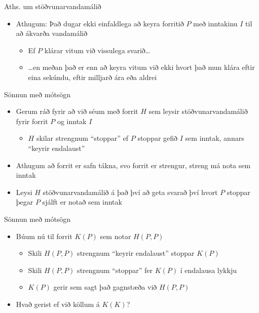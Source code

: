 \documentclass[handout]{beamer}
\begin{document}
\begin{frame}{Aths. um stöðvunarvandamálið}
\begin{itemize}
 \item Athugum: Það dugar ekki einfaldlega að keyra forritið $P$ með inntakinu $I$ til að ákvarða vandamálið
 \begin{itemize}
  \item Ef $P$ klárar vitum við vissulega svarið\ldots
  \item \ldots en meðan það er enn að keyra vitum við ekki hvort það mun klára eftir eina sekúndu, eftir milljarð ára eða aldrei
 \end{itemize}
\end{itemize}
\end{frame}

\begin{frame}{Sönnun með mótsögn}
\begin{itemize}
 \item Gerum ráð fyrir að við séum með forrit $H$ sem leysir stöðvunarvandamálið fyrir forrit $P$ og inntak $I$
 \begin{itemize}
  \item $H$ skilar strengnum ``stoppar'' ef $P$ stoppar gefið $I$ sem inntak, annars ``keyrir endalaust'' \pause
 \end{itemize}
 \item Athugum að forrit er safn tákna, svo forrit er strengur, streng má nota sem inntak
 \item Leysi $H$ stöðvunarvandamálið á það því að geta svarað því hvort $P$ stoppar þegar $P$ sjálft er notað sem inntak
\end{itemize}
\end{frame}

\begin{frame}{Sönnun með mótsögn}
\begin{itemize}
 \item Búum nú til forrit $K(P)$ sem notar $H(P, P)$
 \begin{itemize}
  \item Skili $H(P, P)$ strengnum ``keyrir endalaust'' stoppar $K(P)$ 
  \item Skili $H(P, P)$ strengnum ``stoppar'' fer $K(P)$ í endalausa lykkju
  \item $K(P)$ gerir sem sagt það gagnstæða við $H(P, P)$
 \end{itemize}
 \item Hvað gerist ef við köllum á $K(K)$?
\end{itemize}
\end{frame}
\end{document}
